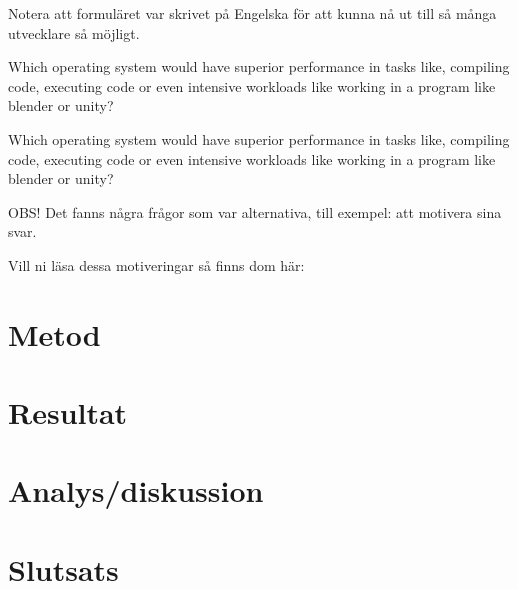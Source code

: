 \documentclass[a4paper, 12pt]{report}
\begin{document}
    Notera att formuläret var skrivet på Engelska för att kunna nå ut till så många utvecklare så möjligt.


    \vspace{8.7cm}


    \large {Which operating system would have superior performance in tasks like, compiling code, executing code or even intensive workloads like working in a program  like blender or unity?}

    \vspace{.2cm}


    \cite{form}
    \vspace{1cm}

    \large {Which operating system would have superior performance in tasks like, compiling code, executing code or even intensive workloads like working in a program  like blender or unity?}

    \vspace{.5cm}



    \cite{form}

    \vspace{1cm}


    \small{OBS! Det fanns några frågor som var alternativa, till exempel: att motivera sina svar.
    
    Vill ni läsa dessa motiveringar så finns dom här:} 


\section{Metod}



\section{Resultat}

\section{Analys/diskussion}



\section{Slutsats}


\printbibliography
\end{document}
